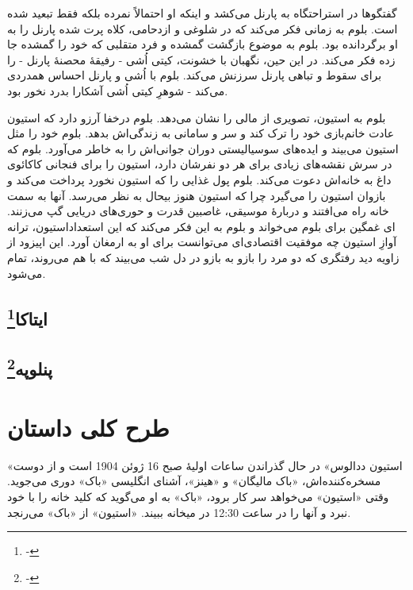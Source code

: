 \documentclass[12pt]{book}
\newcommand{\noun}[1]{«{#1}»}
\begin{document}
    گفتگوها در استراحتگاه به پارنل می‌کشد و اینکه او احتمالاً نمرده بلکه فقط تبعید شده است. بلوم به زمانی فکر می‌کند که در شلوغی و ازدحامی، کلاه پرت شده پارنل را به او برگردانده بود. بلوم به موضوع بازگشت گمشده و فرد متقلبی که خود را گمشده جا زده فکر می‌کند. در این حین، نگهبان با خشونت، کیتی اُشی - رفیقۀ محصنۀ پارنل - را برای سقوط و تباهی پارنل سرزنش می‌کند. بلوم با اُشی و پارنل احساس همدردی می‌کند - شوهرِ کیتی اُشی آشکارا بدرد نخور بود.

    بلوم به استیون، تصویری از مالی را نشان می‌دهد. بلوم درخفا آرزو دارد که استیون عادت خانم‌بازی خود را ترک کند و سر و سامانی به زندگی‌اش بدهد. بلوم خود را مثل استیون می‌بیند و ایده‌های سوسیالیستی دوران جوانی‌اش را به خاطر می‌آورد. بلوم که در سرش نقشه‌های زیادی برای هر دو نفرشان دارد، استیون را برای فنجانی کاکائوی داغ به خانه‌اش دعوت می‌کند. بلوم پول غذایی را که استیون نخورد پرداخت می‌کند و بازوان استیون را می‌گیرد چرا که استیون هنوز بیحال به نظر می‌رسد. آنها به سمت خانه راه می‌افتند و دربارۀ موسیقی، غاصبین قدرت و حوری‌های دریایی گپ می‌زنند. استیون، ترانه‎‌ای غمگین برای بلوم می‌خواند و بلوم به این فکر می‌کند که این استعداد آوازِ استیون چه موفقیت اقتصادی‌ای می‌توانست برای او به ارمغان آورد. این اپیزود از زاویه دید رفتگری که دو مرد را بازو به بازو در دل شب می‌بیند که با هم می‌روند، تمام می‌شود.

    \chapter[ایتاکا]{ایتاکا\protect\footnote{-}}\label{ep:17}

    \chapter[پنلوپه]{پنلوپه\protect\footnote{-}}\label{ep:18}

    \part{طرح کلی داستان}
    \noun{استیون ددالوس} در حال گذراندن ساعات اولیۀ صبح 16 ژوئن 1904 است و از دوست مسخره‌کننده‌اش، \noun{باک مالیگان} و \noun{هینز}، آشنای انگلیسی \noun{باک} دوری می‌جوید. وقتی \noun{استیون} می‌خواهد سر کار برود، \noun{باک} به او می‌گوید که کلید خانه را با خود نبرد و آنها را در ساعت 12:30 در میخانه ببیند. \noun{استیون} از \noun{باک} می‌رنجد.
\end{document}

